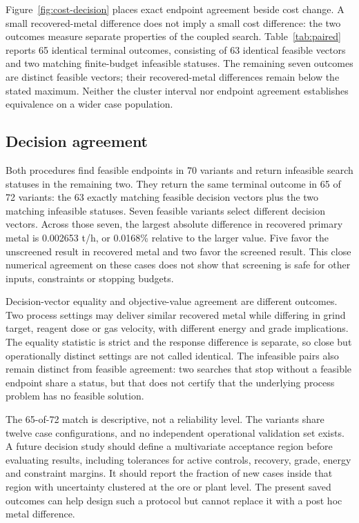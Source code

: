\documentclass[10pt]{article}
\begin{document}
Figure~\ref{fig:cost-decision} places exact endpoint agreement beside cost change. A small recovered-metal difference does not imply a small cost difference: the two outcomes measure separate properties of the coupled search. Table~\ref{tab:paired} reports 65 identical terminal outcomes, consisting of 63 identical feasible vectors and two matching finite-budget infeasible statuses. The remaining seven outcomes are distinct feasible vectors; their recovered-metal differences remain below the stated maximum. Neither the cluster interval nor endpoint agreement establishes equivalence on a wider case population.



\subsection{Decision agreement}
Both procedures find feasible endpoints in 70 variants and return infeasible search statuses in the remaining two. They return the same terminal outcome in 65 of 72 variants: the 63 exactly matching feasible decision vectors plus the two matching infeasible statuses. Seven feasible variants select different decision vectors. Across those seven, the largest absolute difference in recovered primary metal is 0.002653 t/h, or 0.0168\% relative to the larger value. Five favor the unscreened result in recovered metal and two favor the screened result. This close numerical agreement on these cases does not show that screening is safe for other inputs, constraints or stopping budgets.

Decision-vector equality and objective-value agreement are different outcomes. Two process settings may deliver similar recovered metal while differing in grind target, reagent dose or gas velocity, with different energy and grade implications. The equality statistic is strict and the response difference is separate, so close but operationally distinct settings are not called identical. The infeasible pairs also remain distinct from feasible agreement: two searches that stop without a feasible endpoint share a status, but that does not certify that the underlying process problem has no feasible solution.

The 65-of-72 match is descriptive, not a reliability level. The variants share twelve case configurations, and no independent operational validation set exists. A future decision study should define a multivariate acceptance region before evaluating results, including tolerances for active controls, recovery, grade, energy and constraint margins. It should report the fraction of new cases inside that region with uncertainty clustered at the ore or plant level. The present saved outcomes can help design such a protocol but cannot replace it with a post hoc metal difference.
\end{document}
